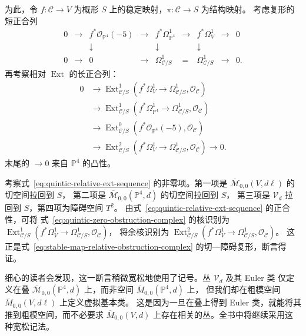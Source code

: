 \begin{example}
为此，令 $f:\mathcal C\to V$ 为概形 $S$ 上的稳定映射，$\pi:\mathcal C\to S$ 为结构映射。
考虑复形的短正合列
\[
\begin{array}{ccccccccc}
0&\longrightarrow&f^*\mathcal O_{\mathbb P^4}(-5)&\longrightarrow&
f^*\Omega_{\mathbb P^4}^1&\longrightarrow&f^*\Omega_V^1&\longrightarrow&0\\
&&\downarrow&&\downarrow&&\downarrow&&\\
0&\longrightarrow&0&\longrightarrow&
\Omega_{\mathcal C/S}^1&=&\Omega_{\mathcal C/S}^1&\longrightarrow&0.
\end{array}
\]
再考察相对 $\operatorname{Ext}$ 的长正合列：
\begin{equation}\label{eq:quintic-relative-ext-sequence}
\begin{aligned}
0&\longrightarrow
\operatorname{Ext}_{\mathcal C/S}^1(f^*\Omega_V^1\to\Omega_{\mathcal C/S}^1,\mathcal O_{\mathcal C})\\
&\longrightarrow
\operatorname{Ext}_{\mathcal C/S}^1(f^*\Omega_{\mathbb P^4}^1\to\Omega_{\mathcal C/S}^1,\mathcal O_{\mathcal C})\\
&\longrightarrow
\operatorname{Ext}_{\mathcal C/S}^0(f^*\mathcal O_{\mathbb P^4}(-5),\mathcal O_{\mathcal C})\\
&\longrightarrow
\operatorname{Ext}_{\mathcal C/S}^2(f^*\Omega_V^1\to\Omega_{\mathcal C/S}^1,\mathcal O_{\mathcal C})
\longrightarrow0.
\end{aligned}
\end{equation}
末尾的 $\to0$ 来自 $\mathbb P^4$ 的凸性。

考察式~\eqref{eq:quintic-relative-ext-sequence} 的非零项。第一项是
$\overline{\mathcal M}_{0,0}(V,d\ell)$ 的切空间拉回到 $S$，
第二项是 $\overline{\mathcal M}_{0,0}(\mathbb P^4,d)$ 的切空间拉回到 $S$，
第三项是 $\mathcal V_d$ 拉回到 $S$，第四项为障碍空间 $T^2$。
由式~\eqref{eq:quintic-relative-ext-sequence} 的正合性，可将
式~\eqref{eq:quintic-zero-obstruction-complex} 的核识别为
$\operatorname{Ext}_{\mathcal C/S}^1(f^*\Omega_V^1\to\Omega_{\mathcal C/S}^1,\mathcal O_{\mathcal C})$，
将余核识别为
$\operatorname{Ext}_{\mathcal C/S}^2(f^*\Omega_V^1\to\Omega_{\mathcal C/S}^1,\mathcal O_{\mathcal C})$。
这正是式~\eqref{eq:stable-map-relative-obstruction-complex} 的切—障碍复形，断言得证。

细心的读者会发现，这一断言稍微宽松地使用了记号。丛 $\mathcal V_d$ 及其 Euler 类
仅定义在叠 $\overline{\mathcal M}_{0,0}(\mathbb P^4,d)$ 上，而非空间 $\overline M_{0,0}(\mathbb P^4,d)$ 上，
但我们却在粗模空间 $\overline M_{0,0}(V,d\ell)$ 上定义虚拟基本类。
这是因为一旦在叠上得到 Euler 类，就能将其推到粗模空间，而不必要求
$\overline M_{0,0}(V,d)$ 上存在相关的丛。全书中将继续采用这种宽松记法。


\end{example}
